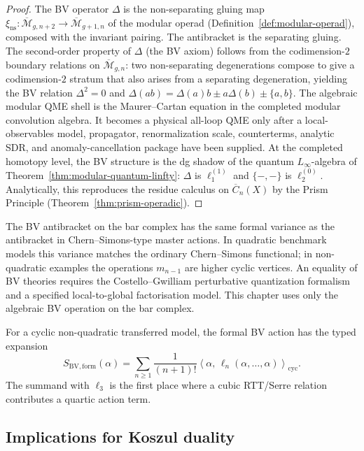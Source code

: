 \begin{proof}
The BV operator $\Delta$ is the non-separating gluing map
$\xi_{\mathrm{ns}}\colon
\overline{\mathcal{M}}_{g,n+2} \to \overline{\mathcal{M}}_{g+1,n}$
of the modular operad
(Definition~\ref{def:modular-operad}), composed with the invariant
pairing. The antibracket is the separating gluing. The second-order
property of $\Delta$ (the BV axiom) follows from the
codimension-$2$ boundary relations on
$\overline{\mathcal{M}}_{g,n}$: two non-separating degenerations
compose to give a codimension-$2$ stratum that also arises from
a separating degeneration, yielding the BV relation
$\Delta^2 = 0$ and $\Delta(ab) = \Delta(a)b \pm a\Delta(b)
\pm \{a,b\}$. The algebraic modular QME shell is the
Maurer--Cartan equation in the completed modular convolution algebra.
It becomes a physical all-loop QME only after a local-observables
model, propagator, renormalization scale, counterterms, analytic SDR,
and anomaly-cancellation package have been supplied. At the completed
homotopy level, the BV structure is the dg shadow of the quantum
$L_\infty$-algebra of
Theorem~\ref{thm:modular-quantum-linfty}: $\Delta$ is $\ell_1^{(1)}$
and $\{-,-\}$ is $\ell_2^{(0)}$.
Analytically, this reproduces the
residue calculus on $\overline{C}_n(X)$ by the Prism Principle
(Theorem~\ref{thm:prism-operadic}).
\end{proof}

\begin{remark}\label{rem:cs-interp}
The BV antibracket on the bar complex has the same formal variance as
the antibracket in Chern--Simons-type master actions.  In quadratic
benchmark models this variance matches the ordinary Chern--Simons
functional; in non-quadratic examples the operations $m_{n-1}$ are
higher cyclic vertices.  An equality of BV theories requires the
Costello--Gwilliam perturbative quantization formalism \cite{CG17}
and a specified local-to-global factorisation model.  This chapter
uses only the algebraic BV operation on the bar complex.
\end{remark}

For a cyclic non-quadratic transferred model, the formal BV action has
the typed expansion
\[
S_{\mathrm{BV,form}}(\alpha)
=\sum_{n\geq1}\frac{1}{(n+1)!}
\left\langle \alpha,\,\ell_n(\alpha,\ldots,\alpha)
\right\rangle_{\mathrm{cyc}}.
\]
The summand with $\ell_3$ is the first place where a cubic
RTT/Serre relation contributes a quartic action term.

\subsection{Implications for Koszul duality}

